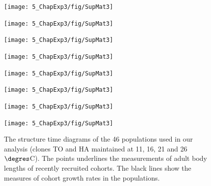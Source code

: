 \begin{figure}[!ht]
   \centering
   \texttt{[image: 5\_ChapExp3/fig/SupMat3]}
\end{figure}
\begin{figure}[!ht] 
    \centering
    \texttt{[image: 5\_ChapExp3/fig/SupMat3]}
\end{figure}
\begin{figure}[!ht]
   \centering
   \texttt{[image: 5\_ChapExp3/fig/SupMat3]}
\end{figure}
\begin{figure}[!ht]
   \centering
   \texttt{[image: 5\_ChapExp3/fig/SupMat3]}
\end{figure}
\begin{figure}[!ht]
   \centering
   \texttt{[image: 5\_ChapExp3/fig/SupMat3]}
\end{figure}
\begin{figure}[!ht]
   \centering
   \texttt{[image: 5\_ChapExp3/fig/SupMat3]}
\end{figure}
\begin{figure}[!ht]
   \centering
   \texttt{[image: 5\_ChapExp3/fig/SupMat3]}
\end{figure}
\begin{figure}[!ht]
   \centering
   \texttt{[image: 5\_ChapExp3/fig/SupMat3]}
   \caption[The structure time diagrams of the 46 populations]{ The structure time
diagrams of the 46 populations used in our analysis (clones TO and HA maintained at 11, 16, 21 and 26$\degres$C). The points underlines the
  measurements of adult body lengths of recently recruited cohorts. The black
  lines show the measures of cohort growth rates in the populations.}
 \label{Fig5-S3}
\end{figure}
%


%


